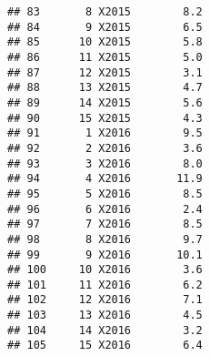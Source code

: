 \documentclass[]{book}
\newenvironment{Shaded}{\begin{snugshade}}{\end{snugshade}}
\newcommand{\KeywordTok}[1]{\textcolor[rgb]{0.13,0.29,0.53}{\textbf{#1}}}
\newcommand{\DataTypeTok}[1]{\textcolor[rgb]{0.13,0.29,0.53}{#1}}
\newcommand{\StringTok}[1]{\textcolor[rgb]{0.31,0.60,0.02}{#1}}
\newcommand{\OperatorTok}[1]{\textcolor[rgb]{0.81,0.36,0.00}{\textbf{#1}}}
\newcommand{\NormalTok}[1]{#1}
\theoremstyle{definition}
\theoremstyle{definition}
\theoremstyle{definition}
\theoremstyle{remark}
\begin{document}
\begin{verbatim}
## 83       8 X2015        8.2
## 84       9 X2015        6.5
## 85      10 X2015        5.8
## 86      11 X2015        5.0
## 87      12 X2015        3.1
## 88      13 X2015        4.7
## 89      14 X2015        5.6
## 90      15 X2015        4.3
## 91       1 X2016        9.5
## 92       2 X2016        3.6
## 93       3 X2016        8.0
## 94       4 X2016       11.9
## 95       5 X2016        8.5
## 96       6 X2016        2.4
## 97       7 X2016        8.5
## 98       8 X2016        9.7
## 99       9 X2016       10.1
## 100     10 X2016        3.6
## 101     11 X2016        6.2
## 102     12 X2016        7.1
## 103     13 X2016        4.5
## 104     14 X2016        3.2
## 105     15 X2016        6.4
\end{verbatim}

\begin{Shaded}
\end{Shaded}
\end{document}
